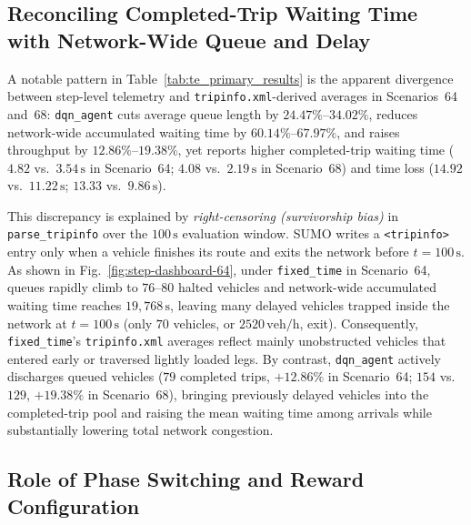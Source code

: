 \subsection{Reconciling Completed-Trip Waiting Time with Network-Wide Queue and Delay}

A notable pattern in Table~\ref{tab:te_primary_results} is the apparent divergence between step-level telemetry and \texttt{tripinfo.xml}-derived averages in Scenarios~64 and~68: \texttt{dqn\_agent} cuts average queue length by $24.47\%\text{--}34.02\%$, reduces network-wide accumulated waiting time by $60.14\%\text{--}67.97\%$, and raises throughput by $12.86\%\text{--}19.38\%$, yet reports higher completed-trip waiting time ($4.82$ vs.\ $3.54\,\mathrm{s}$ in Scenario~64; $4.08$ vs.\ $2.19\,\mathrm{s}$ in Scenario~68) and time loss ($14.92$ vs.\ $11.22\,\mathrm{s}$; $13.33$ vs.\ $9.86\,\mathrm{s}$).

This discrepancy is explained by \emph{right-censoring (survivorship bias)} in \texttt{parse\_tripinfo} over the $100\,\mathrm{s}$ evaluation window. SUMO writes a \texttt{<tripinfo>} entry only when a vehicle finishes its route and exits the network before $t=100\,\mathrm{s}$. As shown in Fig.~\ref{fig:step-dashboard-64}, under \texttt{fixed\_time} in Scenario~64, queues rapidly climb to $76\text{--}80$ halted vehicles and network-wide accumulated waiting time reaches $19{,}768\,\mathrm{s}$, leaving many delayed vehicles trapped inside the network at $t=100\,\mathrm{s}$ (only $70$ vehicles, or $2520\,\mathrm{veh/h}$, exit). Consequently, \texttt{fixed\_time}'s \texttt{tripinfo.xml} averages reflect mainly unobstructed vehicles that entered early or traversed lightly loaded legs. By contrast, \texttt{dqn\_agent} actively discharges queued vehicles ($79$ completed trips, $+12.86\%$ in Scenario~64; $154$ vs.\ $129$, $+19.38\%$ in Scenario~68), bringing previously delayed vehicles into the completed-trip pool and raising the mean waiting time among arrivals while substantially lowering total network congestion.

\subsection{Role of Phase Switching and Reward Configuration}

